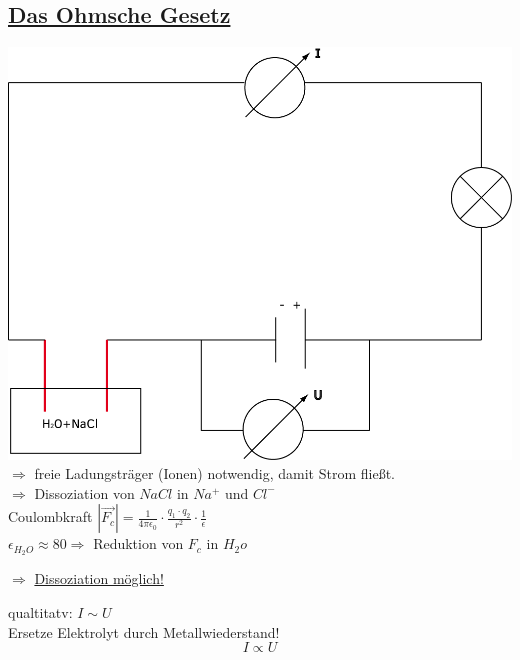 \documentclass[11pt]{article}
\begin{document}
		\subsection{\underline{Das Ohmsche Gesetz}}
		\includegraphics[width=0.7\linewidth]{skizzen/15/VL06/15_3} \\
		$\Rightarrow$ freie Ladungsträger (Ionen) notwendig, damit Strom fließt. \\
		$\Rightarrow$ Dissoziation von $NaCl$ in $Na^+$ und $Cl^-$ \\
		Coulombkraft $|\vec{F_c}| = \frac{1}{4\pi\epsilon_0} \cdot \frac{q_1 \cdot q_2}{r^2} \cdot \frac{1}{\epsilon}$ \\
		$\epsilon_{H_2O}\approx 80 \Rightarrow$ Reduktion von $F_c$ in $H_2o$\\
		\begin{center}
			$\Rightarrow$ \underline{Dissoziation möglich!}
		\end{center}
		qualtitatv: $I \sim U$ \\
		Ersetze Elektrolyt durch Metallwiederstand! \\
		$$I\propto U$$
		\\
\end{document}
